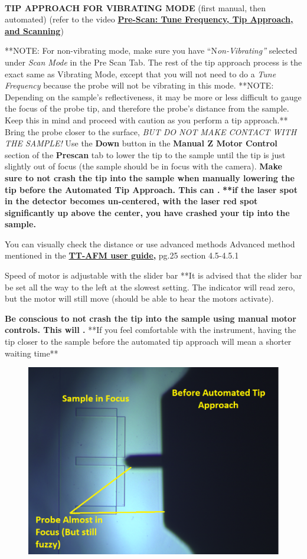 \documentclass{../lab}
\begin{document}
​\textbf{}

\textbf{TIP APPROACH FOR VIBRATING MODE }(first manual, then automated) (refer to the video \href{http://experimentationlab.berkeley.edu/sites/default/files/prescan\_final2.mp4}{\textbf{Pre-Scan: Tune Frequency, Tip Approach, and Scanning}})

**NOTE: For non-vibrating mode, make sure you have ``N\emph{on-Vibrating''} selected under \emph{Scan Mode} in the Pre Scan Tab.  The rest of the tip approach process is the exact same as Vibrating Mode, except that you will not need to do a \emph{Tune Frequency} because the probe will not be vibrating in this mode.
**NOTE: Depending on the sample's reflectiveness, it may be more or less difficult to gauge the focus of the probe tip, and therefore the probe's distance from the sample. Keep this in mind and proceed with caution as you perform a tip approach.**
Bring the probe closer to the surface, \emph{BUT DO NOT MAKE CONTACT WITH THE SAMPLE!} Use the \textbf{Down} button in the \textbf{Manual Z Motor Control} section of the \textbf{Prescan }tab to lower the tip to the sample until the tip is just slightly out of focus (the sample should be in focus with the camera).
\textbf{Make sure to not crash the tip into the sample when manually lowering the tip before the Automated Tip Approach. This can .}
\textbf{**if the laser spot in the detector becomes un-centered, with the laser red spot significantly up above the center, you have crashed your tip into the sample.}


You can visually check the distance or use advanced methods
Advanced method mentioned in the \href{http://experimentationlab.berkeley.edu/tt-afmuserguidev2.2}{\textbf{TT-AFM user guide,}} pg.25 section 4.5-4.5.1

Speed of motor is adjustable with the slider bar
**It is advised that the slider bar be set all the way to the left at the slowest setting.  The indicator will read zero, but the motor will still move (should be able to hear the motors activate).

\textbf{Be conscious to not crash the tip into the sample using manual motor controls. This will .}
**If you feel comfortable with the instrument, having the tip closer to the sample before the automated tip approach will mean a shorter waiting time**


\begin{figure}[h]
    \centering
    \href{http://dev-physicsadv.pantheon.berkeley.edu/sites/default/files/AFMImages/probe_unfocused2_0.png}{\includegraphics[width=0.5\linewidth]{images/probe_unfocused2_0.png}}
    \caption{}
    \label{fig:probe_unfocused2_0}
\end{figure}
\end{document}
